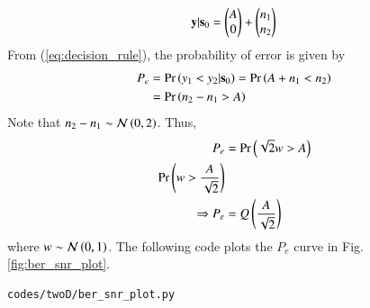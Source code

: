 \begin{enumerate}[label=\thesection.\arabic*.,ref=\thesection.\theenumi]
\begin{align}
\mathbf{y}|\mathbf{s}_0 = \begin{pmatrix} A \\ 0 \end{pmatrix} + \begin{pmatrix} n_1 \\ n_2 \end{pmatrix}
\end{align}
From (\ref{eq:decision_rule}), the probability of error is given by 
\begin{align}
P_e &= \Pr\left(y_1 < y_2 |\mathbf{s}_0\right) = \Pr\left(A+n_1 < n_2\right)\\
&= \Pr\left(n_2 - n_1 > A\right)
\end{align}
Note that $n_2 - n_1 \sim \mathcal{N}\left(0,2\right)$. Thus,
\begin{align}
P_e &= \Pr\left(\sqrt{2}w > A\right)\\
\Pr\left(w > \dfrac{A}{\sqrt{2}}\right)\\
\Rightarrow P_e &= Q\left(\frac{A}{\sqrt{2}}\right)
\end{align}
where $w \sim \mathcal{N}\left(0,1\right)$. The following code plots the $P_e$ curve in Fig. \ref{fig:ber_snr_plot}.
\begin{lstlisting}
codes/twoD/ber_snr_plot.py
\end{lstlisting}
\end{enumerate}
